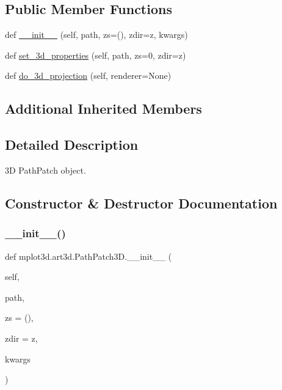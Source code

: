 \subsection*{Public Member Functions}
\begin{DoxyCompactItemize}
\item 
def \hyperlink{classmplot3d_1_1art3d_1_1PathPatch3D_a01c5eb97ba56a3962a362baf3ce07fd2}{\+\_\+\+\_\+init\+\_\+\+\_\+} (self, path, zs=(), zdir=\textquotesingle{}z\textquotesingle{}, kwargs)
\item 
def \hyperlink{classmplot3d_1_1art3d_1_1PathPatch3D_a492b46222fd64154840289c3b32a24cd}{set\+\_\+3d\+\_\+properties} (self, path, zs=0, zdir=\textquotesingle{}z\textquotesingle{})
\item 
def \hyperlink{classmplot3d_1_1art3d_1_1PathPatch3D_af96de959b9d9a1328b785bb90bfb75a1}{do\+\_\+3d\+\_\+projection} (self, renderer=None)
\end{DoxyCompactItemize}
\subsection*{Additional Inherited Members}


\subsection{Detailed Description}
\begin{DoxyVerb}3D PathPatch object.
\end{DoxyVerb}
 

\subsection{Constructor \& Destructor Documentation}
\mbox{\label{classmplot3d_1_1art3d_1_1PathPatch3D_a01c5eb97ba56a3962a362baf3ce07fd2}} 
\subsubsection{\texorpdfstring{\+\_\+\+\_\+init\+\_\+\+\_\+()}{\_\_init\_\_()}}
{\footnotesize\ttfamily def mplot3d.\+art3d.\+Path\+Patch3\+D.\+\_\+\+\_\+init\+\_\+\+\_\+ (\begin{DoxyParamCaption}\item[{}]{self,  }\item[{}]{path,  }\item[{}]{zs = {\ttfamily ()},  }\item[{}]{zdir = {\ttfamily \textquotesingle{}z\textquotesingle{}},  }\item[{}]{kwargs }\end{DoxyParamCaption})}



